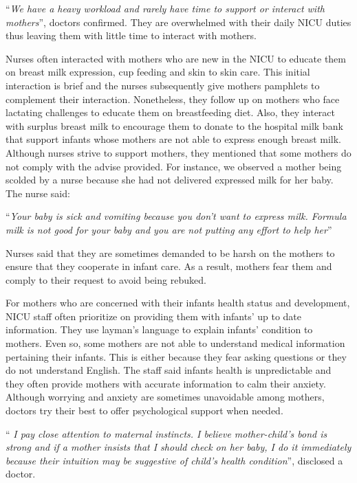 \enquote{\itshape We have a heavy workload and rarely have time to support or interact with mothers}, doctors confirmed. They are overwhelmed with their daily NICU duties thus leaving them with little time to interact with mothers.

Nurses often interacted with mothers who are new in the NICU to educate them on breast milk expression, cup feeding and skin to skin care. This initial interaction is brief and the nurses subsequently give mothers pamphlets to complement their interaction. Nonetheless, they follow up on mothers who face lactating challenges to educate them on breastfeeding diet. Also, they interact with surplus breast milk to encourage them to donate to the hospital milk bank that support infants whose mothers are not able to express enough breast milk. Although nurses strive to support mothers, they mentioned that some mothers do not comply with the advise provided. For instance, we observed a mother being scolded by a nurse because she had not delivered expressed milk for her baby. The nurse said:

\enquote{\itshape Your baby is sick and vomiting because you don’t want to express milk. Formula milk is not good for your baby and you are not putting any effort to help her}\bigbreak

Nurses said that they are sometimes demanded to be harsh on the mothers to ensure that they cooperate in infant care. As a result, mothers fear them and comply to their request to avoid being rebuked. 

For mothers who are concerned with their infants health status and development, NICU staff often prioritize on providing them with infants' up to date information. They use layman's language to explain infants' condition to mothers. Even so, some mothers are not able to understand medical information pertaining their infants. This is either because they fear asking questions or they do not understand English. The staff said infants health is unpredictable and they often provide mothers with accurate information to calm their anxiety. Although worrying and anxiety are sometimes unavoidable among mothers, doctors try their best to offer psychological support when needed. 

\enquote{ \itshape I pay close attention to maternal instincts. I believe mother-child's bond is strong and if a mother insists that I should check on her baby, I do it immediately because their intuition may be suggestive of child’s health condition}, disclosed a doctor. \bigbreak

